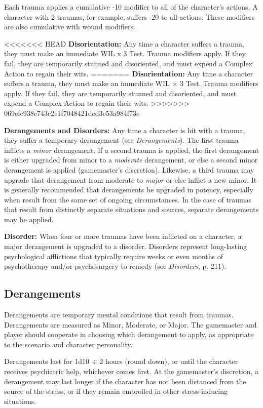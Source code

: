 Each trauma applies a cumulative -10 modifier to all of the character’s actions. A character with 2 traumas, for example, suffers -20 to all actions. These modifiers are also cumulative with wound modifiers.

<<<<<<< HEAD
\textbf{Disorientation:} Any time a character suffers a trauma, they must make an immediate WIL x 3 Test. Trauma modifiers apply. If they fail, they are temporarily stunned and disoriented, and must expend a Complex Action to regain their wits.
=======
\textbf{Disorientation:} Any time a character suffers a trauma, they must make an immediate WIL $\times$ 3 Test. Trauma modifiers apply. If they fail, they are temporarily stunned and disoriented, and must expend a Complex Action to regain their wits.
>>>>>>> 069efc938e743c2e1f7048421dcd3e53a984f73e

\textbf{Derangements and Disorders:} Any time a character is hit with a trauma, they suffer a temporary derangement (see \emph{Derangements}). The first trauma inflicts a \emph{minor} derangement. If a second trauma is applied, the first derangement is either upgraded from minor to a \emph{moderate} derangement, or else a second minor derangement is applied (gamemaster’s discretion). Likewise, a third trauma may upgrade that derangement from moderate to \emph{major} or else inflict a new minor. It is generally recommended that derangements be upgraded in potency, especially when result from the same set of ongoing circumstances. In the case of traumas that result from distinctly separate situations and sources, separate derangements may be applied.

\textbf{Disorder:} When four or more traumas have been inflicted on a character, a major derangement is upgraded to a disorder. Disorders represent long-lasting psychological afflictions that typically require weeks or even months of psychotherapy and/or psychosurgery to remedy (see \emph{Disorders}, p. 211).


\subsection{Derangements}
\label{sec:derangements}

Derangements are temporary mental conditions that result from traumas. Derangements are measured as Minor, Moderate, or Major. The gamemaster and player should cooperate in choosing which derangement to apply, as appropriate to the scenario and character personality.

Derangements last for 1d10 $\div$ 2 hours (round down), or until the character receives psychiatric help, whichever comes first. At the gamemaster’s discretion, a derangement may last longer if the character has not been distanced from the source of the stress, or if they remain embroiled in other stress-inducing situations.

